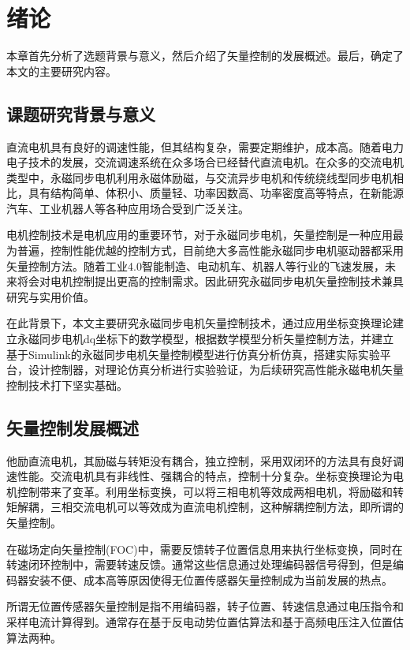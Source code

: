 \chapter{绪论}\label{ch:intr}
本章首先分析了选题背景与意义，然后介绍了矢量控制的发展概述。最后，确定了本文的主要研究内容。
\section{课题研究背景与意义}
直流电机具有良好的调速性能，但其结构复杂，需要定期维护，成本高。随着电力电子技术的发展，交流调速系统在众多场合已经替代直流电机。在众多的交流电机类型中，永磁同步电机利用永磁体励磁，与交流异步电机和传统绕线型同步电机相比，具有结构简单、体积小、质量轻、功率因数高、功率密度高等特点，在新能源汽车、工业机器人等各种应用场合受到广泛关注。

电机控制技术是电机应用的重要环节，对于永磁同步电机，矢量控制是一种应用最为普遍，控制性能优越的控制方式，目前绝大多高性能永磁同步电机驱动器都采用矢量控制方法。随着工业4.0智能制造、电动机车、机器人等行业的飞速发展，未来将会对电机控制提出更高的控制需求。因此研究永磁同步电机矢量控制技术兼具研究与实用价值。

在此背景下，本文主要研究永磁同步电机矢量控制技术，通过应用坐标变换理论建立永磁同步电机dq坐标下的数学模型，根据数学模型分析矢量控制方法，并建立基于Simulink的永磁同步电机矢量控制模型进行仿真分析仿真，搭建实际实验平台，设计控制器，对理论仿真分析进行实验验证，为后续研究高性能永磁电机矢量控制技术打下坚实基础。
\section{矢量控制发展概述}
他励直流电机，其励磁与转矩没有耦合，独立控制，采用双闭环的方法具有良好调速性能。交流电机具有非线性、强耦合的特点，控制十分复杂。坐标变换理论为电机控制带来了变革。利用坐标变换，可以将三相电机等效成两相电机，将励磁和转矩解耦，三相交流电机可以等效成为直流电机控制，这种解耦控制方法，即所谓的矢量控制。

在磁场定向矢量控制(FOC)中，需要反馈转子位置信息用来执行坐标变换，同时在转速闭环控制中，需要转速反馈。通常这些信息通过处理编码器信号得到，但是编码器安装不便、成本高等原因使得无位置传感器矢量控制成为当前发展的热点。

所谓无位置传感器矢量控制是指不用编码器，转子位置、转速信息通过电压指令和采样电流计算得到。通常存在基于反电动势位置估算法和基于高频电压注入位置估算法两种。

